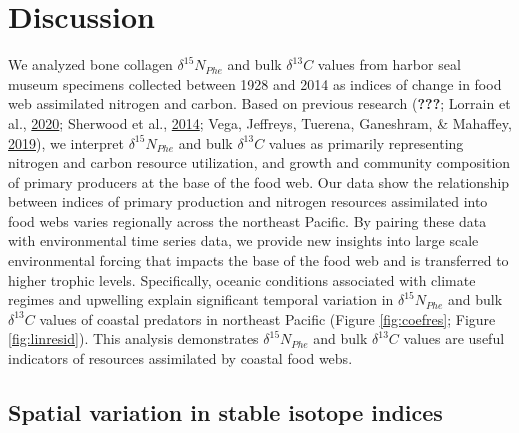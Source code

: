 \documentclass [11pt, proquest] {uwthesis}[2015/03/03]
\begin{document}
\section{Discussion}\label{discussion-1}

We analyzed bone collagen \(\delta^{15}N_{Phe}\) and bulk
\(\delta^{13}C\) values from harbor seal museum specimens collected
between 1928 and 2014 as indices of change in food web assimilated
nitrogen and carbon. Based on previous research ({\textbf{???}}; Lorrain
et al., \protect\hyperlink{ref-Lorrain2020}{2020}; Sherwood et al.,
\protect\hyperlink{ref-Sherwood2014}{2014}; Vega, Jeffreys, Tuerena,
Ganeshram, \& Mahaffey, \protect\hyperlink{ref-delaVega2019}{2019}), we
interpret \(\delta^{15}N_{Phe}\) and bulk \(\delta^{13}C\) values as
primarily representing nitrogen and carbon resource utilization, and
growth and community composition of primary producers at the base of the
food web. Our data show the relationship between indices of primary
production and nitrogen resources assimilated into food webs varies
regionally across the northeast Pacific. By pairing these data with
environmental time series data, we provide new insights into large scale
environmental forcing that impacts the base of the food web and is
transferred to higher trophic levels. Specifically, oceanic conditions
associated with climate regimes and upwelling explain significant
temporal variation in \(\delta^{15}N_{Phe}\) and bulk \(\delta^{13}C\)
values of coastal predators in northeast Pacific (Figure
\ref{fig:coefres}; Figure \ref{fig:linresid}). This analysis
demonstrates \(\delta^{15}N_{Phe}\) and bulk \(\delta^{13}C\) values are
useful indicators of resources assimilated by coastal food webs.

\subsection{Spatial variation in stable isotope
indices}\label{spatial-variation-in-stable-isotope-indices}
\end{document}
